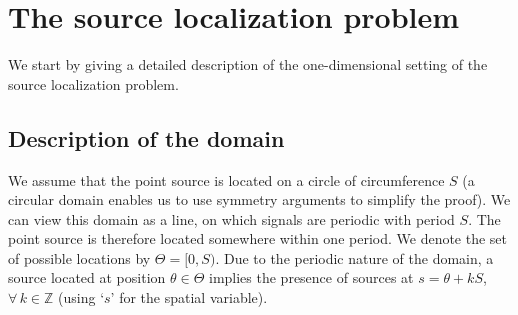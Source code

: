 \documentclass[conference]{IEEEtran}
\begin{document}


\section{The source localization problem}
\label{sec:source-localization}

We start by giving a detailed description of the one-dimensional setting of the
source localization problem.

\subsection{Description of the domain}

We assume that the point source is located on a circle of circumference $S$ (a
circular domain enables us to use symmetry arguments to simplify the proof). We
can view this domain as a line, on which signals are periodic with period $S$.
The point source is therefore located somewhere within one period. We denote
the set of possible locations by $\Theta = [0, S)$. Due to the periodic nature
of the domain, a source located at position $\theta \in \Theta$ implies the
presence of sources at $s = \theta + kS$,~$\forall \, k \in \mathbb Z$ (using
`$s$' for the spatial variable).
\end{document}
